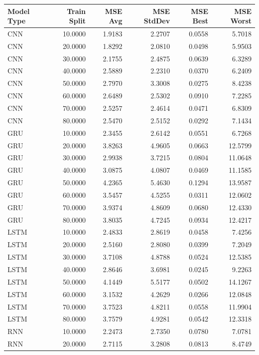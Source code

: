 \begin{tabular}{lrrrrr}
\toprule
Model Type & Train Split & MSE Avg & MSE StdDev & MSE Best & MSE Worst \\
\midrule
CNN & 10.0000 & 1.9183 & 2.2707 & 0.0558 & 5.7018 \\
CNN & 20.0000 & 1.8292 & 2.0810 & 0.0498 & 5.9503 \\
CNN & 30.0000 & 2.1755 & 2.4875 & 0.0639 & 6.3289 \\
CNN & 40.0000 & 2.5889 & 2.2310 & 0.0370 & 6.2409 \\
CNN & 50.0000 & 2.7970 & 3.3008 & 0.0275 & 8.4238 \\
CNN & 60.0000 & 2.6489 & 2.5302 & 0.0910 & 7.2285 \\
CNN & 70.0000 & 2.5257 & 2.4614 & 0.0471 & 6.8309 \\
CNN & 80.0000 & 2.5470 & 2.5152 & 0.0292 & 7.1434 \\
GRU & 10.0000 & 2.3455 & 2.6142 & 0.0551 & 6.7268 \\
GRU & 20.0000 & 3.8263 & 4.9605 & 0.0663 & 12.5799 \\
GRU & 30.0000 & 2.9938 & 3.7215 & 0.0804 & 11.0648 \\
GRU & 40.0000 & 3.0875 & 4.0807 & 0.0469 & 11.1585 \\
GRU & 50.0000 & 4.2365 & 5.4630 & 0.1294 & 13.9587 \\
GRU & 60.0000 & 3.5457 & 4.5255 & 0.0311 & 12.0602 \\
GRU & 70.0000 & 3.9374 & 4.8609 & 0.0680 & 12.4330 \\
GRU & 80.0000 & 3.8035 & 4.7245 & 0.0934 & 12.4217 \\
LSTM & 10.0000 & 2.4833 & 2.8619 & 0.0458 & 7.4256 \\
LSTM & 20.0000 & 2.5160 & 2.8080 & 0.0399 & 7.2049 \\
LSTM & 30.0000 & 3.7108 & 4.8788 & 0.0524 & 12.5385 \\
LSTM & 40.0000 & 2.8646 & 3.6981 & 0.0245 & 9.2263 \\
LSTM & 50.0000 & 4.1449 & 5.5177 & 0.0502 & 14.1267 \\
LSTM & 60.0000 & 3.1532 & 4.2629 & 0.0266 & 12.0848 \\
LSTM & 70.0000 & 3.7523 & 4.8211 & 0.0558 & 11.9904 \\
LSTM & 80.0000 & 3.7579 & 4.9281 & 0.0542 & 12.3318 \\
RNN & 10.0000 & 2.2473 & 2.7350 & 0.0780 & 7.0781 \\
RNN & 20.0000 & 2.7115 & 3.2808 & 0.0813 & 8.4749 \\

\end{tabular}
